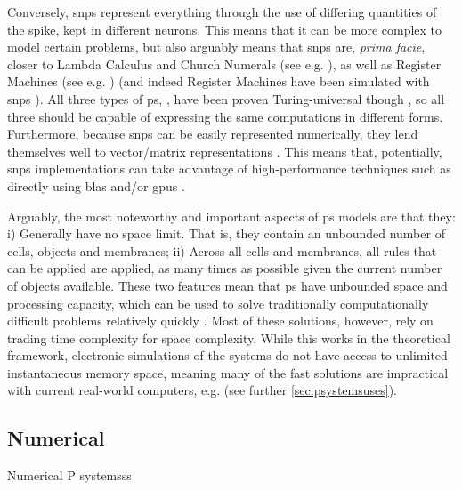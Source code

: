 Conversely, \gls{snps} represent everything through the use of differing quantities of the spike, kept in different neurons.  This means that it can be more complex to model certain problems, but also arguably means that \gls{snps} are, \textit{prima facie}, closer to Lambda Calculus \cite{Barendregt1984} and Church Numerals (see e.g. \cite{Koopman2014,Hinze2005}), as well as Register Machines (see e.g. \cite{Korec1996}) (and indeed Register Machines have been simulated with \gls{snps} \cite{Pan2010}).  All three types of \gls{ps}, , have been proven Turing-universal though \cite{Bernardini2005,Chen2008,Freund2005}, so all three should be capable of expressing the same computations in different forms.  Furthermore, because \gls{snps} can be easily represented numerically, they lend themselves well to vector/matrix representations \cite{Zeng2010,Martinez-del-Amor2021,Gheorghe2021,Hu2016}.  This means that, potentially, \gls{snps} implementations can take advantage of high-performance techniques such as directly using \gls{blas} and/or \glspl{gpu} \cite{Aboy2019}.

Arguably, the most noteworthy and important aspects of \gls{ps} models are that they:  i) Generally have no space limit.  That is, they contain an unbounded number of cells, objects and membranes;  ii) Across all cells and membranes, all rules that can be applied are applied, as many times as possible given the current number of objects available.  These two features mean that \gls{ps} have unbounded space and processing capacity, which can be used to solve traditionally computationally difficult problems relatively quickly \cite{Sosik2003,Jimenez2003,Paun1999a,Henderson2020}.  Most of these solutions, however, rely on trading time complexity for space complexity.  While this works in the theoretical framework, electronic simulations of the systems do not have access to unlimited instantaneous memory space, meaning many of the fast solutions are impractical with current real-world computers, e.g. \cite{Cooper2019,Cooper2019a} \fxnote[inline]{[refs]} (see further \cref{sec:psystemsuses}).

\subsection{\label{subsec:numpsys}Numerical }
Numerical P systemsss

